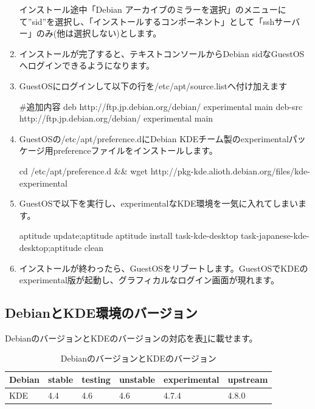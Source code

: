 \documentclass[mingoth,a4paper]{jsarticle}
\begin{document}
\begin{enumerate}
\begin{commandline}
\end{commandline}
インストール途中「Debian アーカイブのミラーを選択」のメニューにて''sid''を選択し、「インストールするコンポーネント」として「sshサーバー」のみ(他は選択しない)とします。
\item インストールが完了すると、テキストコンソールからDebian sidなGuestOSへログインできるようになります。
\item GuestOSにログインして以下の行を/etc/apt/source.listへ付け加えます
\begin{commandline}
#追加内容
deb http://ftp.jp.debian.org/debian/ experimental main
deb-src http://ftp.jp.debian.org/debian/ experimental main
\end{commandline}
\item GuestOSの/etc/apt/preference.dにDebian KDEチーム製のexperimentalパッケージ用preferenceファイルをインストールします。
\begin{commandline}
cd /etc/apt/preference.d && wget http://pkg-kde.alioth.debian.org/files/kde-experimental
\end{commandline}
\item GuestOSで以下を実行し、experimentalなKDE環境を一気に入れてしまいます。
\begin{commandline}
aptitude update;aptitude aptitude install task-kde-desktop task-japanese-kde-desktop;aptitude clean
\end{commandline}
\item インストールが終わったら、GuestOSをリブートします。GuestOSでKDEのexperimental版が起動し、グラフィカルなログイン画面が現れます。
\end{enumerate}

\subsection{DebianとKDE環境のバージョン}

DebianのバージョンとKDEのバージョンの対応を表\ref{tab:kde-ver}に載せます。

\begin{table}[ht]
\begin{center}
\begin{tabular}{|l|l|l|l|l||l|}
\hline
Debian&stable&testing&unstable&experimental&upstream\\
\hline \hline
KDE &4.4&4.6&4.6&4.7.4&4.8.0\\
\hline
\end{tabular}
\caption{\label{tab:kde-ver}DebianのバージョンとKDEのバージョン}
\end{center}
\end{table}
\end{document}
